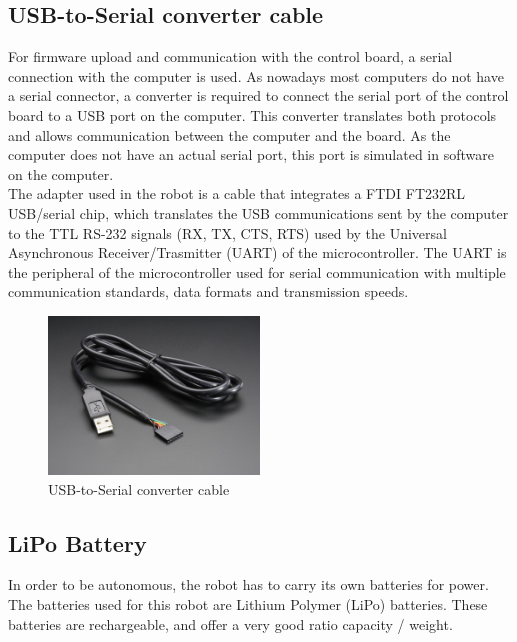 \subsection{USB-to-Serial converter cable}

For firmware upload and communication with the control board, a serial connection with the computer is used. As nowadays most computers do not have a serial connector, a converter is required to connect the serial port of the control board to a USB port on the computer. This converter translates both protocols and allows communication between the computer and the board. As the computer does not have an actual serial port, this port is simulated in software on the computer.\\

The adapter used in the robot is a cable that integrates a FTDI FT232RL USB/serial chip, which translates the USB communications sent by the computer to the TTL RS-232 signals (RX, TX, CTS, RTS) used by the Universal Asynchronous Receiver/Trasmitter (UART) of the microcontroller. The UART is the peripheral of the microcontroller used for serial communication with multiple communication standards, data formats and transmission speeds.\\

\begin{figure}[h]
		\centering
        \includegraphics[width=0.5\textwidth]{images/Hardware_ftdi.jpg}
        \caption{USB-to-Serial converter cable}
        \label{fig:hardware_ftdi}
\end{figure} 


\subsection{LiPo Battery}

In order to be autonomous, the robot has to carry its own batteries for power. The batteries used for this robot are Lithium Polymer (LiPo) batteries. These batteries are rechargeable, and offer a very good ratio capacity / weight.\\

